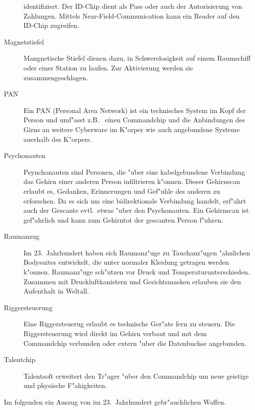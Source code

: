 \begin{description}
      identifiziert. Der ID-Chip dient als Pass oder auch der Autorisierung von Zahlungen. Mittels Near-Field-Communication kann ein Reader auf den ID-Chip zugreifen.
\item [Magnetstiefel] Mangnetische Stiefel dienen dazu, in Schwerelosigkeit auf einem Raumschiff oder einer Station zu
      laufen. Zur Aktivierung werden sie zusammengeschlagen.
\item[PAN] Ein PAN (Personal Area Network) ist ein technisches System im Kopf der Person und umf"asst z.B.~ einen Commandchip und   
      die Anbindungen des Girns an weitere Cyberware im K"orper wie auch angebundene Systeme au\3erhalb des K"orpers.
\item [Psychonauten] Psynchonauten sind Personen, die "uber eine kabelgebundene Verbindung das Gehirn
      einer anderen Person infiltrieren k"onnen. Dieser Gehirnscan erlaubt es, Gedanken, Erinnerungen und Gef"uhle des anderen zu erforschen. Da es sich um eine bidirektionale Verbindung handelt, erf"ahrt auch der Gescante evtl.~etwas "uber den Psychonauten. Ein Gehirnscan ist gef"ahrlich und kann zum Gehirntot der gescanten Person f"uhren.
\item [Raumanzug] Im 23.~Jahrhundert haben sich Raumanz"uge zu Tauchanz"ugen "ahnlichen Bodysuites entwickelt, die unter
      normaler Kleidung getragen werden k"onnen. Raumanz"uge sch"utzen vor Druck und Temperaturunterschieden. Zusammen mit Druckluftkanistern und Gesichtsmasken erlauben sie den Aufenthalt in Weltall.
\item [Riggersteuerung] Eine Riggersteuerug erlaubt es technische Ger"ate fern zu steuern. Die Riggersteuerung wird direkt im 
      Gehirn verbaut und mit dem Commandchip verbunden oder extern "uber die Datenbuchse angebunden.
\item[Talentchip] Talentsoft erweitert den Tr"ager "uber den Commandchip um neue geistige und physische F"ahigkeiten. 
\end{description}


Im folgenden ein Auszug von im 23.~Jahrhundert gebr"auchlichen Waffen.

